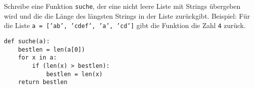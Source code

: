 \question[6]
Schreibe eine Funktion \texttt{suche}, der eine nicht leere Liste mit
Strings übergeben wird und die die Länge des längsten Strings in der Liste zurückgibt.
Beispiel: Für die Liste \texttt{a = ['ab', 'cdef', 'a', 'cd']} gibt die Funktion
die Zahl \texttt{4} zurück.
\begin{solutionbox}{8cm}
\begin{lstlisting}
def suche(a):
    bestlen = len(a[0])
    for x in a:
        if (len(x) > bestlen):
            bestlen = len(x)
    return bestlen
\end{lstlisting}
\end{solutionbox}

